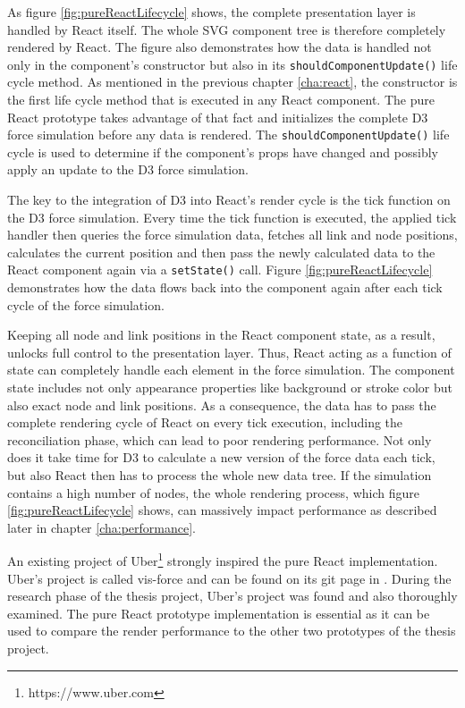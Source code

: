 As figure \ref{fig:pureReactLifecycle} shows, the complete presentation layer is handled by React itself. The whole SVG component tree is therefore completely rendered by React. The figure also demonstrates how the data is handled not only in the component's constructor but also in its \texttt{shouldComponentUpdate()} life cycle method. As mentioned in the previous chapter \ref{cha:react}, the constructor is the first life cycle method that is executed in any React component. The pure React prototype takes advantage of that fact and initializes the complete D3 force simulation before any data is rendered. The \texttt{shouldComponentUpdate()} life cycle is used to determine if the component's props have changed and possibly apply an update to the D3 force simulation.

The key to the integration of D3 into React's render cycle is the tick function on the D3 force simulation. Every time the tick function is executed, the applied tick handler then queries the force simulation data, fetches all link and node positions, calculates the current position and then pass the newly calculated data to the React component again via a \texttt{setState()} call. Figure \ref{fig:pureReactLifecycle} demonstrates how the data flows back into the component again after each tick cycle of the force simulation.

Keeping all node and link positions in the React component state, as a result, unlocks full control to the presentation layer. Thus, React acting as a function of state can completely handle each element in the force simulation. The component state includes not only appearance properties like background or stroke color but also exact node and link positions. As a consequence, the data has to pass the complete rendering cycle of React on every tick execution, including the reconciliation phase, which can lead to poor rendering performance. Not only does it take time for D3 to calculate a new version of the force data each tick, but also React then has to process the whole new data tree. If the simulation contains a high number of nodes, the whole rendering process, which figure \ref{fig:pureReactLifecycle} shows, can massively impact performance as described later in chapter \ref{cha:performance}.

An existing project of Uber\footnote{https://www.uber.com} strongly inspired the pure React implementation. Uber's project is called vis-force and can be found on its git page in \cite{UberVisForce}. During the research phase of the thesis project, Uber's project was found and also thoroughly examined. The pure React prototype implementation is essential as it can be used to compare the render performance to the other two prototypes of the thesis project.

